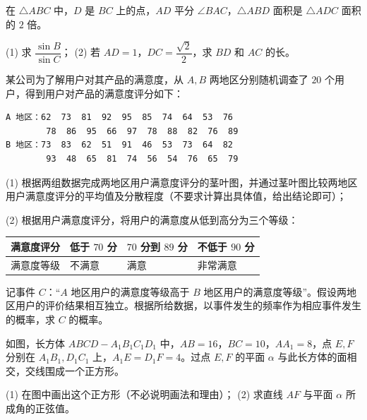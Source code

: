\begin{question}
在 $\triangle ABC$ 中，$D$ 是 $BC$ 上的点，$AD$ 平分 $\angle BAC$，$\triangle ABD$ 面积是 $\triangle ADC$ 面积的 $2$ 倍。

(1) 求 $\dfrac{\sin B}{\sin C}$；  
(2) 若 $AD=1$，$DC=\dfrac{\sqrt2}{2}$，求 $BD$ 和 $AC$ 的长。

\Needspace{0.4\textheight}
\end{question}
\begin{question}
某公司为了解用户对其产品的满意度，从 $A,B$ 两地区分别随机调查了 $20$ 个用户，得到用户对产品的满意度评分如下：

\begin{verbatim}
A 地区：62  73  81  92  95  85  74  64  53  76
        78  86  95  66  97  78  88  82  76  89
B 地区：73  83  62  51  91  46  53  73  64  82
        93  48  65  81  74  56  54  76  65  79
\end{verbatim}

(1) 根据两组数据完成两地区用户满意度评分的茎叶图，并通过茎叶图比较两地区用户满意度评分的平均值及分散程度（不要求计算出具体值，给出结论即可）；
\nopagebreak[4]
\begin{center}\end{center}
\nopagebreak[4]
(2) 根据用户满意度评分，将用户的满意度从低到高分为三个等级：

\begin{center}
\begin{tabular}{llll}
\toprule
满意度评分 & 低于 $70$ 分 & $70$ 分到 $89$ 分 & 不低于 $90$ 分 \\
\midrule
满意度等级 & 不满意 & 满意 & 非常满意 \\
\bottomrule
\end{tabular}
\end{center}

记事件 $C$：“$A$ 地区用户的满意度等级高于 $B$ 地区用户的满意度等级”。假设两地区用户的评价结果相互独立。根据所给数据，以事件发生的频率作为相应事件发生的概率，求 $C$ 的概率。

\Needspace{0.4\textheight}
\end{question}
\begin{question}
如图，长方体 $ABCD-A_1B_1C_1D_1$ 中，$AB=16$，$BC=10$，$AA_1=8$，点 $E,F$ 分别在 $A_1B_1,D_1C_1$ 上，$A_1E=D_1F=4$。过点 $E,F$ 的平面 $\alpha$ 与此长方体的面相交，交线围成一个正方形。

(1) 在图中画出这个正方形（不必说明画法和理由）；  
(2) 求直线 $AF$ 与平面 $\alpha$ 所成角的正弦值。
\nopagebreak[4]
\begin{center}\end{center}
\nopagebreak[4]
\end{question}
